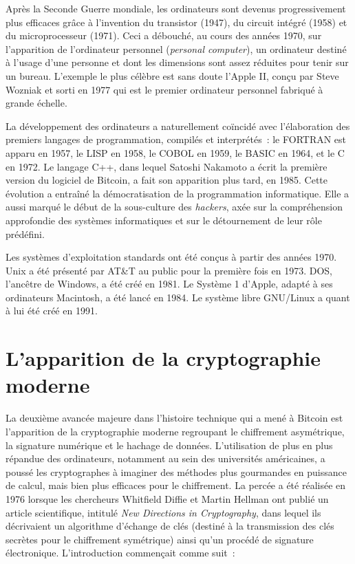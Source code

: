 \documentclass[
  a5paper,
  smalldemyvopaper,10pt,twoside,onecolumn,openright,extrafontsizes,hidelinks]{memoir}
\begin{document}
Après la Seconde Guerre mondiale, les ordinateurs sont devenus
progressivement plus efficaces grâce à l'invention du transistor (1947),
du circuit intégré (1958) et du microprocesseur (1971). Ceci a débouché,
au cours des années 1970, sur l'apparition de l'ordinateur personnel
(\emph{personal computer}), un ordinateur destiné à l'usage d'une
personne et dont les dimensions sont assez réduites pour tenir sur un
bureau. L'exemple le plus célèbre est sans doute l'Apple II, conçu par
Steve Wozniak et sorti en 1977 qui est le premier ordinateur personnel
fabriqué à grande échelle.

La développement des ordinateurs a naturellement coïncidé avec
l'élaboration des premiers langages de programmation, compilés et
interprétés~: le FORTRAN est apparu en 1957, le LISP en 1958, le COBOL
en 1959, le BASIC en 1964, et le C en 1972. Le langage C++, dans lequel
Satoshi Nakamoto a écrit la première version du logiciel de Bitcoin, a
fait son apparition plus tard, en 1985. Cette évolution a entraîné la
démocratisation de la programmation informatique. Elle a aussi marqué le
début de la sous-culture des \emph{hackers}, axée sur la compréhension
approfondie des systèmes informatiques et sur le détournement de leur
rôle prédéfini.

Les systèmes d'exploitation standards ont été conçus à partir des années
1970. Unix a été présenté par AT\&T au public pour la première fois en
1973. DOS, l'ancêtre de Windows, a été créé en 1981. Le Système 1
d'Apple, adapté à ses ordinateurs Macintosh, a été lancé en 1984. Le
système libre GNU/Linux a quant à lui été créé en 1991.

\section*{L'apparition de la cryptographie
moderne}\label{lapparition-de-la-cryptographie-moderne}


La deuxième avancée majeure dans l'histoire technique qui a mené à
Bitcoin est l'apparition de la cryptographie moderne regroupant le
chiffrement asymétrique, la signature numérique et le hachage de
données. L'utilisation de plus en plus répandue des ordinateurs,
notamment au sein des universités américaines, a poussé les
cryptographes à imaginer des méthodes plus gourmandes en puissance de
calcul, mais bien plus efficaces pour le chiffrement. La percée a été
réalisée en 1976 lorsque les chercheurs Whitfield Diffie et Martin
Hellman ont publié un article scientifique, intitulé \emph{New
Directions in Cryptography}, dans lequel ils décrivaient un algorithme
d'échange de clés (destiné à la transmission des clés secrètes pour le
chiffrement symétrique) ainsi qu'un procédé de signature électronique.
L'introduction commençait comme suit~:
\end{document}
